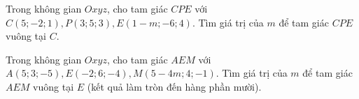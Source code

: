 \documentclass[12pt,a4paper]{article}
\begin{document}
\begin{ex}
	Trong không gian ${Oxyz}$, cho tam giác ${CPE}$ với $C(5;-2;1), P(3;5;3), E(1 - m;-6;4)$. Tìm giá trị của ${m}$ để tam giác ${CPE}$ vuông tại ${C}$.
	
	\end{ex}

\begin{ex}
	Trong không gian ${Oxyz}$, cho tam giác ${AEM}$ với $A(5;3;-5), E(-2;6;-4), M(5 - 4 m;4;-1)$. Tìm giá trị của ${m}$ để tam giác ${AEM}$ vuông tại ${E}$ (kết quả làm tròn đến hàng phần mười).
	
	\end{ex}






\newpage 
\end{document}
